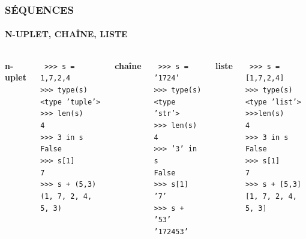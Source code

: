 \begin{frame}
\frametitle{\uppercase{Séquences}}
\framesubtitle{\uppercase{n-uplet, chaîne, liste}}
\begin{columns}[T]

\column{3.5cm}
{\bf n-uplet}

\begin{py}{3.4cm}\tt
>{>}> s = 1,7,2,4\\%
>{>}> type(s)\\
<type 'tuple'>\\%
>{>}> len(s)\\
4\\%
>{>}> 3 in s\\
False\\%
>{>}> s[1]\\
7\\%
>{>}> s + (5,3)\\
(1, 7, 2, 4, 5, 3)
\end{py}

\column{3.5cm}
{\bf chaîne}

\begin{py}{3.4cm}\tt
>{>}> s = '1724'\\%
>{>}> type(s)\\
<type 'str'>\\%
>{>}> len(s)\\
4\\%
>{>}> '3' in s\\
False\\%
>{>}> s[1]\\
'7'\\%
>{>}> s + '53'\\
'172453'
\end{py}

\column{3.5cm}
{\bf liste}

\begin{py}{3.4cm}\tt
>{>}> s = [1,7,2,4]\\%
>{>}> type(s)\\
<type 'list'>\\%
>{>}>len(s)\\
4\\%
>{>}> 3 in s\\
False\\%
>{>}> s[1]\\
7\\%
>{>}> s + [5,3]\\
\mbox{}[1, 7, 2, 4, 5, 3]
\end{py}

\end{columns}
\end{frame}
